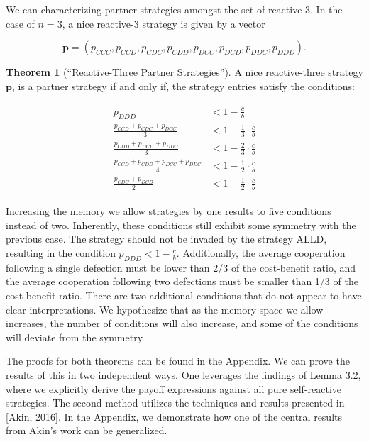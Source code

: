 \documentclass{article}
\theoremstyle{definition}
\newtheorem{theorem}{Theorem}[section]
\begin{document}
We can characterizing partner strategies amongst
the set of reactive-$3$. In the case of $n=3$, a nice reactive-3 strategy is
given by a vector

$$\mathbf{p}=(p_{CCC}, p_{CCD}, p_{CDC}, p_{CDD}, p_{DCC}, p_{DCD}, p_{DDC}, p_{DDD}).$$

\begin{theorem}[``Reactive-Three Partner Strategies'']\label{theorem:reactive_three_partner_strategies}
  A nice reactive-three strategy $\mathbf{p}$, is a partner strategy if and only if,
  the strategy entries satisfy the conditions:
  
  \begin{align}\label{eq:three_bit_conditions}
    \begin{split}
    p_{DDD} & < 1\!-\! \frac{c}{b} \\
    \frac{p_{CCD} + p_{CDC} + p_{DCC}}{3} & < 1\!-\! \frac{1}{3} \cdot \frac{c}{b} \\
    \frac{p_{CDD} + p_{DCD} + p_{DDC}}{3} & < 1\!-\! \frac{2}{3} \cdot \frac{c}{b} \\
    \frac{p_{CCD} + p_{CDD} + p_{DCC} + p_{DDC}}{4}  & < 1\!-\! \frac{1}{2} \cdot \frac{c}{b}  \\
    \frac{p_{CDC} + p_{DCD}}{2} & < 1\!-\! \frac{1}{2} \cdot \frac{c}{b}
    \end{split}
  \end{align}
\end{theorem}

Increasing the memory we allow strategies by one results to five conditions instead
of two. Inherently, these conditions still exhibit some symmetry with the
previous case. The strategy should not be invaded by the strategy ALLD,
resulting in the condition $p_{DDD} < 1 - \frac{c}{b}$. Additionally, the
average cooperation following a single defection must be lower than 2/3 of the
cost-benefit ratio, and the average cooperation following two defections must be
smaller than 1/3 of the cost-benefit ratio. There are two additional conditions
that do not appear to have clear interpretations. We hypothesize that as the
memory space we allow increases, the number of conditions will also increase,
and some of the conditions will deviate from the symmetry.

The proofs for both theorems can be found in the Appendix. We can prove the
results of this in two independent ways. One leverages the findings of Lemma
3.2, where we explicitly derive the payoff expressions against all pure
self-reactive strategies. The second method utilizes the techniques and results
presented in [Akin, 2016]. In the Appendix, we demonstrate how one of the
central results from Akin's work can be generalized.
\end{document}

